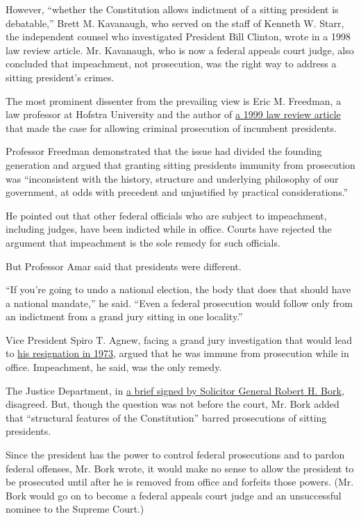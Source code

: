 However, ``whether the Constitution allows indictment of a sitting
president is debatable,'' Brett M. Kavanaugh, who served on the staff of
Kenneth W. Starr, the independent counsel who investigated President
Bill Clinton, wrote in a 1998 law review article. Mr. Kavanaugh, who is
now a federal appeals court judge, also concluded that impeachment, not
prosecution, was the right way to address a sitting president's crimes.

The most prominent dissenter from the prevailing view is Eric M.
Freedman, a law professor at Hofstra University and the author of
\href{http://scholarlycommons.law.hofstra.edu/cgi/viewcontent.cgi?article=2059\&context=hlr}{a
1999 law review article} that made the case for allowing criminal
prosecution of incumbent presidents.

Professor Freedman demonstrated that the issue had divided the founding
generation and argued that granting sitting presidents immunity from
prosecution was ``inconsistent with the history, structure and
underlying philosophy of our government, at odds with precedent and
unjustified by practical considerations.''

He pointed out that other federal officials who are subject to
impeachment, including judges, have been indicted while in office.
Courts have rejected the argument that impeachment is the sole remedy
for such officials.

But Professor Amar said that presidents were different.

``If you're going to undo a national election, the body that does that
should have a national mandate,'' he said. ``Even a federal prosecution
would follow only from an indictment from a grand jury sitting in one
locality.''

Vice President Spiro T. Agnew, facing a grand jury investigation that
would lead to
\href{http://www.nytimes3xbfgragh.onion/learning/general/onthisday/big/1010.html}{his
resignation in 1973}, argued that he was immune from prosecution while
in office. Impeachment, he said, was the only remedy.

The Justice Department, in
\href{http://query.nytimes3xbfgragh.onion/mem/archive-free/pdf?res=990CE3D71F30E63ABC4E53DFB6678388669EDE}{a
brief signed by Solicitor General Robert H. Bork}, disagreed. But,
though the question was not before the court, Mr. Bork added that
``structural features of the Constitution'' barred prosecutions of
sitting presidents.

Since the president has the power to control federal prosecutions and to
pardon federal offenses, Mr. Bork wrote, it would make no sense to allow
the president to be prosecuted until after he is removed from office and
forfeits those powers. (Mr. Bork would go on to become a federal appeals
court judge and an unsuccessful nominee to the Supreme Court.)

